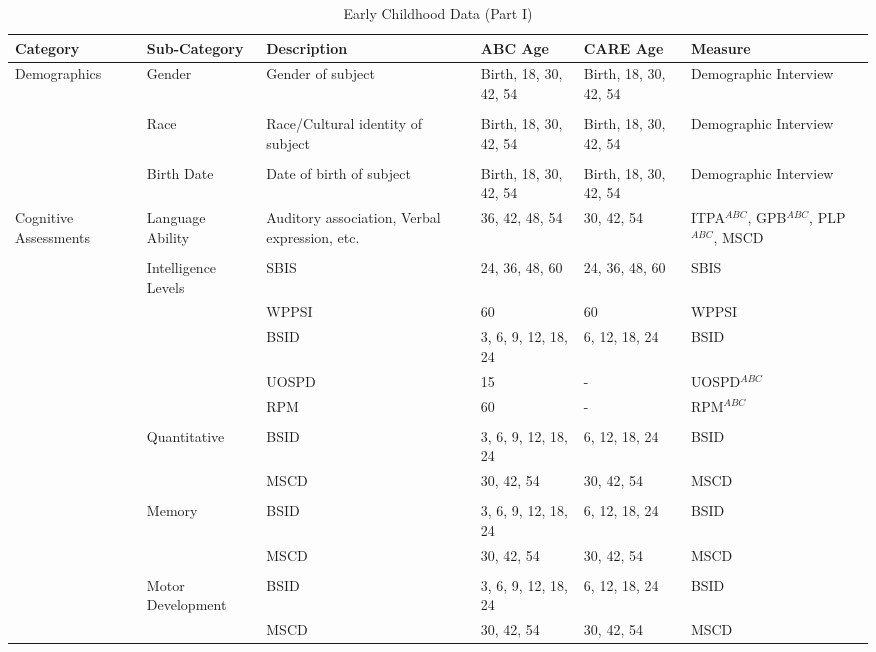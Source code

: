 \begin{sidewaystable}[H]
\small
\caption{Early Childhood Data (Part I)}
\label{tab:ecvars_1}
\centering
\begin{adjustbox}{max width=\textwidth, max height=\textheight,keepaspectratio}
\begin{threeparttable}
\tiny
\begin{tabular}{L{3cm} C{3.5cm} C{4cm} C{1.5cm} C{1.5cm}  C{6cm}}
\toprule
\textbf{Category}	&	\textbf{Sub-Category}	&	\textbf{Description}	&	\textbf{ABC Age}  	&  \textbf{CARE Age}  & 	\textbf{Measure}	\\ \midrule
Demographics	&	Gender	&	Gender of subject	&	Birth, 18, 30, 42, 54	&	 Birth, 18, 30, 42, 54	&	Demographic Interview	\\
	&	\\
	&	Race	&	Race/Cultural identity of subject	&	Birth, 18, 30, 42, 54	&	 Birth, 18, 30, 42, 54	&	 Demographic Interview\\
	&	\\
	&	Birth Date	&	Date of birth of subject	&	Birth, 18, 30, 42, 54	& 	Birth, 18, 30, 42, 54	&	 Demographic Interview	\\ \midrule
Cognitive Assessments	&	Language Ability	&	Auditory association, Verbal expression, etc. 	&	36, 42, 48, 54	&	30, 42, 54	&	ITPA$^{ABC}$, GPB$^{ABC}$, PLP$^{ABC}$, MSCD \\
	&	\\
	&	Intelligence Levels	&	SBIS 	&	24, 36, 48, 60	&	24, 36, 48, 60	&	SBIS	\\
	&		&	WPPSI	&	60	&	60	&	WPPSI	\\
	&		&	BSID 	&	3, 6, 9, 12, 18, 24	&	6, 12, 18, 24		&	BSID	\\
	&		&	UOSPD	&	15	&	- 	&	UOSPD$^{ABC}$	\\
	&		&	RPM	&	60	&	-	&	RPM$^{ABC}$	\\
	&	\\
	&	Quantitative	 &	BSID 	&	3, 6, 9, 12, 18, 24	&	6, 12, 18, 24		&	BSID	\\
	&		&	MSCD 	&	30, 42, 54		&	30, 42, 54	&	MSCD	\\
	&	\\
	&	Memory	&	BSID 	&	3, 6, 9, 12, 18, 24	& 	6, 12, 18, 24		&	BSID	\\
	&		&	MSCD 	&	30, 42, 54	&	30, 42, 54	&	MSCD	\\
	&	\\
	&	Motor Development	&	BSID 	&	3, 6, 9, 12, 18, 24	&	6, 12, 18, 24		&	BSID\\
	&		&	MSCD 	&	30, 42, 54	&	30, 42, 54	&	MSCD	\\

\end{tabular}
\end{threeparttable}
\end{adjustbox}
\end{sidewaystable}
